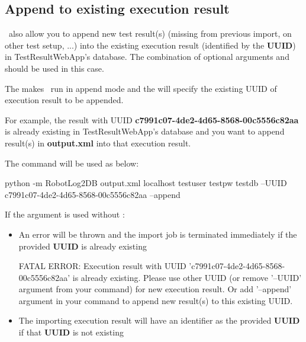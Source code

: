 \hypertarget{append-to-existing-execution-result}{%
\subsection{Append to existing execution result}\label{append-to-existing-execution-result}}

\pkg\ also allow you to append new test result(s) (missing from previous import, 
on other test setup, ...) into the existing execution result (identified by the 
\textbf{UUID}) in TestResultWebApp's database. 
The combination of optional arguments  and  
should be used in this case.

The  makes \pkg\ run in append mode and the  
will specify the existing UUID of execution result to be appended.

For example, the result with UUID \textbf{c7991c07-4de2-4d65-8568-00c5556c82aa} 
is already existing in TestResultWebApp's database and you want to append
result(s) in \textbf{output.xml} into that execution result.

The command will be used as below:

\begin{robotlog}
python -m RobotLog2DB output.xml localhost testuser testpw testdb --UUID c7991c07-4de2-4d65-8568-00c5556c82aa --append
\end{robotlog}

If the argument  is used without :

\begin{itemize}
  \item An error will be thrown and the import job is terminated immediately if 
        the provided \textbf{UUID} is already existing

\begin{robotlog}
FATAL ERROR: Execution result with UUID 'c7991c07-4de2-4d65-8568-00c5556c82aa' is already existing.
             Please use other UUID (or remove '--UUID' argument from your command) for new execution result.
             Or add '--append' argument in your command to append new result(s) to this existing UUID.
\end{robotlog}
  \item The importing execution result will have an identifier as the provided
        \textbf{UUID} if that \textbf{UUID} is not existing
\end{itemize}

